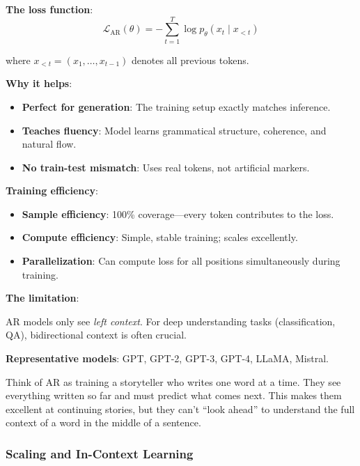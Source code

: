 \documentclass{article}
\begin{document}
\textbf{The loss function}:
\begin{equation}
\mathcal{L}_{\text{AR}}(\theta) = -\sum_{t=1}^{T} \log p_\theta(x_t \mid x_{<t})
\end{equation}

where $x_{<t} = (x_1, \ldots, x_{t-1})$ denotes all previous tokens.

\textbf{Why it helps}:

\begin{itemize}
\item \textbf{Perfect for generation}: The training setup exactly matches inference.
\item \textbf{Teaches fluency}: Model learns grammatical structure, coherence, and natural flow.
\item \textbf{No train-test mismatch}: Uses real tokens, not artificial markers.
\end{itemize}

\textbf{Training efficiency}:

\begin{itemize}
\item \textbf{Sample efficiency}: 100\% coverage---every token contributes to the loss.
\item \textbf{Compute efficiency}: Simple, stable training; scales excellently.
\item \textbf{Parallelization}: Can compute loss for all positions simultaneously during training.
\end{itemize}

\textbf{The limitation}:

AR models only see \textit{left context}. For deep understanding tasks (classification, QA), bidirectional context is often crucial.

\textbf{Representative models}: GPT, GPT-2, GPT-3, GPT-4, LLaMA, Mistral.

\begin{tcolorbox}[colback=green!5!white, colframe=green!50!black, title=Intuition: The Storyteller]
Think of AR as training a storyteller who writes one word at a time. They see everything written so far and must predict what comes next. This makes them excellent at continuing stories, but they can't ``look ahead'' to understand the full context of a word in the middle of a sentence.
\end{tcolorbox}

\subsubsection{Scaling and In-Context Learning}
\end{document}
